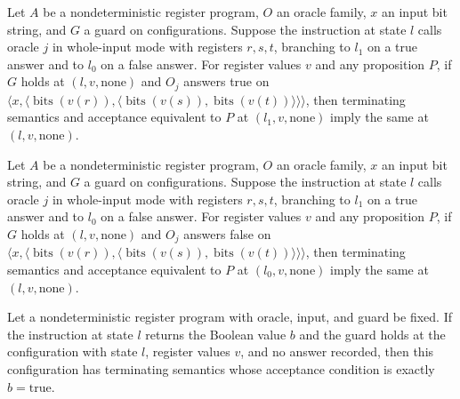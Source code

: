 \begin{lemma}
\leanok
{}
Let $A$ be a nondeterministic register program, $O$ an oracle family, $x$ an input bit
string, and $G$ a guard on configurations. Suppose the instruction at state $l$ calls
oracle $j$ in whole-input mode with registers $r,s,t$, branching to $l_1$ on a true
answer and to $l_0$ on a false answer. For register values $v$ and any proposition $P$,
if $G$ holds at $(l,v,\mathrm{none})$ and $O_j$ answers true on $\langle
x,\langle\operatorname{bits}(v(r)),\langle\operatorname{bits}(v(s)),\operatorname{bits}(v(t))\rangle\rangle\rangle$,
then terminating semantics and acceptance equivalent to $P$ at $(l_1,v,\mathrm{none})$
imply the same at $(l,v,\mathrm{none})$.
\end{lemma}

\begin{lemma}
\leanok
{}
Let $A$ be a nondeterministic register program, $O$ an oracle family, $x$ an input bit
string, and $G$ a guard on configurations. Suppose the instruction at state $l$ calls
oracle $j$ in whole-input mode with registers $r,s,t$, branching to $l_1$ on a true
answer and to $l_0$ on a false answer. For register values $v$ and any proposition $P$,
if $G$ holds at $(l,v,\mathrm{none})$ and $O_j$ answers false on $\langle
x,\langle\operatorname{bits}(v(r)),\langle\operatorname{bits}(v(s)),\operatorname{bits}(v(t))\rangle\rangle\rangle$,
then terminating semantics and acceptance equivalent to $P$ at $(l_0,v,\mathrm{none})$
imply the same at $(l,v,\mathrm{none})$.
\end{lemma}

\begin{lemma}
\label{Complexity.LogProg.NSem.ret}
\leanok
{}
Let a nondeterministic register program with oracle, input, and guard be fixed. If the
instruction at state $l$ returns the Boolean value $b$ and the guard holds at the
configuration with state $l$, register values $v$, and no answer recorded, then this
configuration has terminating semantics whose acceptance condition is exactly
$b=\mathrm{true}$.
\end{lemma}

